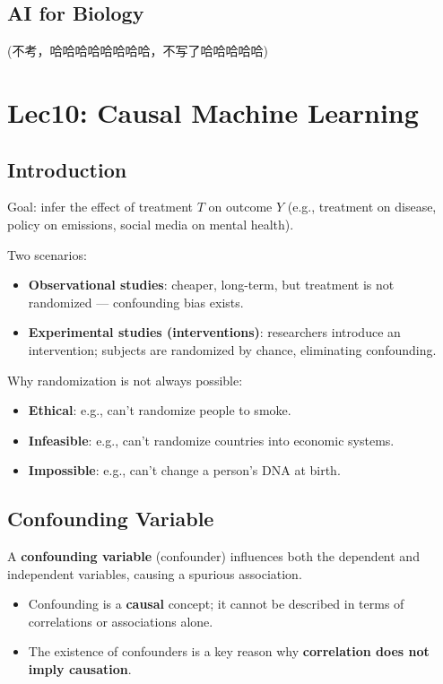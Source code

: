 \documentclass[UTF8]{ctexart}
\begin{document}
\subsection{AI for Biology}
(不考，哈哈哈哈哈哈哈哈，不写了哈哈哈哈哈)

\section{Lec10: Causal Machine Learning}

\subsection{Introduction}
Goal: infer the effect of treatment $T$ on outcome $Y$ (e.g., treatment on disease, policy on emissions, social media on mental health).

Two scenarios:
\begin{itemize}
    \item \textbf{Observational studies}: cheaper, long-term, but treatment is not randomized — confounding bias exists.
    \item \textbf{Experimental studies (interventions)}: researchers introduce an intervention; subjects are randomized by chance, eliminating confounding.
\end{itemize}

Why randomization is not always possible:
\begin{itemize}
    \item \textbf{Ethical}: e.g., can't randomize people to smoke.
    \item \textbf{Infeasible}: e.g., can't randomize countries into economic systems.
    \item \textbf{Impossible}: e.g., can't change a person's DNA at birth.
\end{itemize}

\subsection{Confounding Variable}
A \textbf{confounding variable} (confounder) influences both the dependent and independent variables, causing a spurious association.
\begin{itemize}
    \item Confounding is a \textbf{causal} concept; it cannot be described in terms of correlations or associations alone.
    \item The existence of confounders is a key reason why \textbf{correlation does not imply causation}.
\end{itemize}
\end{document}
